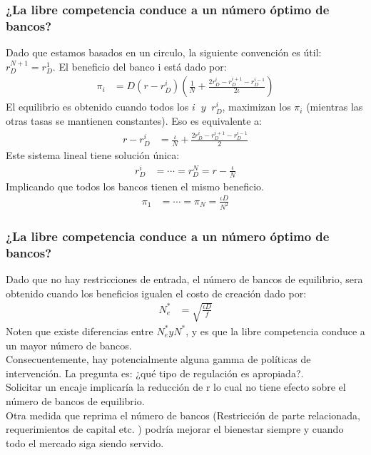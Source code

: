 \begin{frame}
    \frametitle{{\normalsize ¿La libre competencia conduce a un número óptimo de bancos?} {}}
    Dado que estamos basados en un circulo, la siguiente convención es útil: 
    $r_{D}^{N+1}=r_{D}^{1}$. El beneficio del banco i está dado por:
    \begin{align}
    \pi_{i}&=D(r-r_{D}^{i})\left(\frac{1}{N}+\frac{2r_{D}^{i}-r_{D}^{i+1}-r_{D}^{i-1}}{2\iota} \right) \nonumber
    \end{align}  
    El equilibrio es obtenido cuando todos los $i\; \; y\; \; r_{D}^{i}$, maximizan los $\pi_{i}$ (mientras las otras tasas se mantienen constantes). Eso es equivalente a:
     \begin{align}
     r-r_{D}^{i}&=\frac{\iota}{N}+\frac{2r_{D}^{i}-r_{D}^{i+1}-r_{D}^{i-1}}{2}  \nonumber
     \end{align}  
    Este sistema lineal tiene solución única: 
    \begin{align}
    r_{D}^{i}&=\cdots=r_{D}^{N}=r-\frac{\iota}{N} \nonumber
    \end{align} 
    Implicando que todos los bancos tienen el mismo beneficio.
    \begin{align}
    \pi_{1}&=\cdots=\pi_{N}=\frac{\iota D}{N^{2}} \nonumber
    \end{align} 
\end{frame}


\begin{frame}
    \frametitle{{\normalsize ¿La libre competencia conduce a un número óptimo de bancos?} {}}
   Dado que no hay restricciones de entrada, el número de bancos de equilibrio, sera obtenido cuando los beneficios igualen el costo de creación dado por:
   \begin{align}
   N_{e}^{*}&=\sqrt{\frac{\iota D}{f}}\nonumber
   \end{align} 
   Noten que existe diferencias entre $N_{e}^{*} y N^{*}$, y es que la libre competencia conduce a un mayor número de bancos.\\
   Consecuentemente, hay potencialmente alguna gamma de políticas de intervención. La pregunta es: ¿qué tipo de regulación es apropiada?.\\
   Solicitar un encaje implicaría la reducción de r lo cual no tiene efecto sobre el número de bancos de equilibrio.\\ 
   Otra medida que reprima el número de bancos (Restricción de parte relacionada, requerimientos de capital etc. ) podría mejorar el bienestar 
   siempre y cuando todo el mercado siga siendo servido. 
\end{frame}



